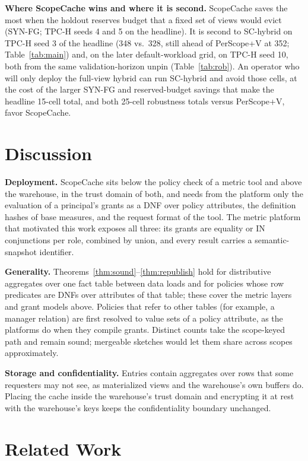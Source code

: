\documentclass[sigconf, nonacm]{acmart}
\newcommand{\M}[1]{\textsf{#1}}
\begin{document}


\textbf{Where ScopeCache wins and where it is second.} ScopeCache saves the most when the holdout reserves budget that a fixed set of views would evict (SYN-FG; TPC-H seeds 4 and 5 on the headline). It is second to \M{SC-hybrid} on TPC-H seed 3 of the headline (348 vs.\ 328, still ahead of \M{PerScope+V} at 352; Table~\ref{tab:main}) and, on the later default-workload grid, on TPC-H seed 10, both from the same validation-horizon unpin (Table~\ref{tab:rob}). An operator who will only deploy the full-view hybrid can run \M{SC-hybrid} and avoid those cells, at the cost of the larger SYN-FG and reserved-budget savings that make the headline 15-cell total, and both 25-cell robustness totals versus \M{PerScope+V}, favor ScopeCache.

\section{Discussion}
\label{sec:discussion}
\textbf{Deployment.} ScopeCache sits below the policy check of a metric tool and above the warehouse, in the trust domain of both, and needs from the platform only the evaluation of a principal's grants as a DNF over policy attributes, the definition hashes of base measures, and the request format of the tool. The metric platform that motivated this work exposes all three: its grants are equality or IN conjunctions per role, combined by union, and every result carries a semantic-snapshot identifier.

\textbf{Generality.} Theorems~\ref{thm:sound}--\ref{thm:republish} hold for distributive aggregates over one fact table between data loads and for policies whose row predicates are DNFs over attributes of that table; these cover the metric layers and grant models above. Policies that refer to other tables (for example, a manager relation) are first resolved to value sets of a policy attribute, as the platforms do when they compile grants. Distinct counts take the scope-keyed path and remain sound; mergeable sketches would let them share across scopes approximately.

\textbf{Storage and confidentiality.} Entries contain aggregates over rows that some requesters may not see, as materialized views and the warehouse's own buffers do. Placing the cache inside the warehouse's trust domain and encrypting it at rest with the warehouse's keys keeps the confidentiality boundary unchanged.

\section{Related Work}
\label{sec:related}
\end{document}
